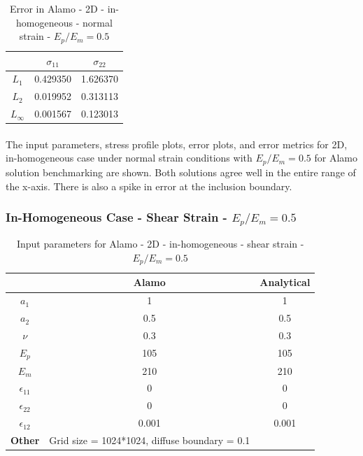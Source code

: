 \documentclass[12pt, a4paper]{report}
\begin{document}
\begin{table}[H]
    \centering
    \begin{tabular}{|c|c|c|}
        \hline
        &\textbf{$\sigma_{11}$} &  \textbf{$\sigma_{22}$} \\
        \hline
        $L_1$ & 0.429350 & 1.626370 \\
        \hline
        $L_2$ & 0.019952 & 0.313113  \\
        \hline 
        $L_\infty$ & 0.001567 & 0.123013 \\
        \hline
    \end{tabular}
    \caption{Error in Alamo - 2D - in-homogeneous - normal strain - $E_p/E_m = 0.5$}
\end{table}


\paragraph{}
The input parameters, stress profile plots, error plots, and error metrics for 2D, in-homogeneous case under normal strain conditions with $E_p/E_m = 0.5$ for Alamo solution benchmarking are shown. Both solutions agree well in the entire range of the x-axis. There is also a spike in error at the inclusion boundary.

\newpage

\subsubsection{In-Homogeneous Case - Shear Strain - $E_p/E_m = 0.5$}
\begin{table}[H]
    \centering
    \begin{tabular}{|c|c|c|}
        \hline
        & \textbf{Alamo} &\textbf{Analytical}\\
        \hline
        \textbf{$a_1$} & 1 & 1 \\
        \hline
        \textbf{$a_2$} & 0.5 & 0.5 \\
        \hline
        \textbf{$\nu$} & 0.3 & 0.3 \\
        \hline
        \textbf{$E_p$} & 105 & 105 \\
        \hline
        \textbf{$E_m$} & 210 & 210 \\
        \hline
        \textbf{$\epsilon_{11}$} & 0 & 0 \\
        \hline
        \textbf{$\epsilon_{22}$} & 0 & 0 \\
        \hline
        \textbf{$\epsilon_{12}$} & 0.001 & 0.001 \\
        \hline
        \textbf{Other} & Grid size = 1024*1024, diffuse boundary = 0.1&  \\
        \hline
    \end{tabular}
    \caption{Input parameters for Alamo - 2D - in-homogeneous - shear strain - $E_p/E_m = 0.5$}
\end{table}
\end{document}
